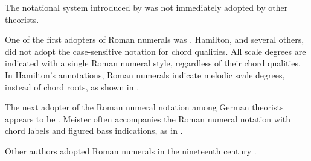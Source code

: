 

The notational system introduced by
\textcite{weber1817versuch} was not immediately adopted by
other theorists. 


One of the first adopters of Roman numerals 
was \textcite{hamilton1840catechism}. Hamilton, and several
others, did not adopt the case-sensitive notation for chord
qualities. All scale degrees are indicated with a single
Roman numeral style, regardless of their chord qualities. In
Hamilton's annotations, Roman numerals indicate melodic
scale degrees, instead of chord roots, as shown in
.


The next adopter of the Roman numeral notation among German
theorists appears to be \textcite{meister1852vollstandige}.
Meister often accompanies the Roman numeral notation with
chord labels and figured bass indications, as in
.


Other authors adopted Roman numerals in the nineteenth
century \parencite{sechter1853grundsatze,
richter1860lehrbuch, tiersch1874elementarbuch,
tracy1878theory}.